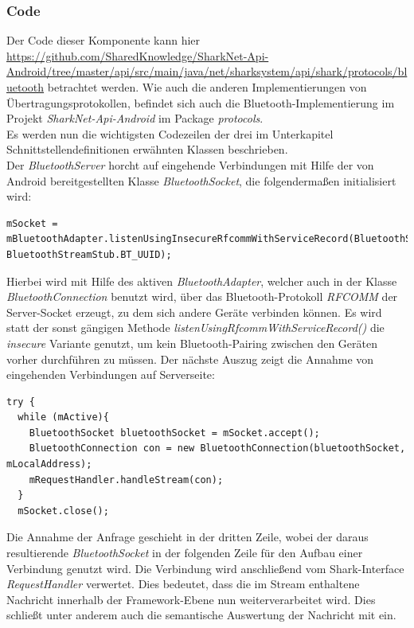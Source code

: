 \subsubsection{Code}
Der Code dieser Komponente kann hier \url{https://github.com/SharedKnowledge/SharkNet-Api-Android/tree/master/api/src/main/java/net/sharksystem/api/shark/protocols/bluetooth} betrachtet werden. Wie auch die anderen Implementierungen von Übertragungsprotokollen, befindet sich auch die Bluetooth-Implementierung im Projekt \textit{SharkNet-Api-Android} im Package \textit{protocols}. 
\\Es werden nun die wichtigsten Codezeilen der drei im Unterkapitel Schnittstellendefinitionen erwähnten Klassen beschrieben.
\\Der \textit{BluetoothServer} horcht auf eingehende Verbindungen mit Hilfe der von Android bereitgestellten Klasse \textit{BluetoothSocket}, die folgendermaßen initialisiert wird:
 \lstset{language=Java, caption=Initialisierung des Bluetooth-Server-Sockets, label=DescriptiveLabel, numbers=left, numbersep=1em, breaklines=true, basicstyle=\small}
\begin{lstlisting}
mSocket = mBluetoothAdapter.listenUsingInsecureRfcommWithServiceRecord(BluetoothStreamStub.BT_NAME, BluetoothStreamStub.BT_UUID);
\end{lstlisting}
Hierbei wird mit Hilfe des aktiven \textit{BluetoothAdapter}, welcher auch in der Klasse \textit{BluetoothConnection} benutzt wird, über das Bluetooth-Protokoll \textit{RFCOMM} der Server-Socket erzeugt, zu dem sich andere Geräte verbinden können. Es wird statt der sonst gängigen Methode \textit{listenUsingRfcommWithServiceRecord()} die \textit{insecure} Variante genutzt, um kein Bluetooth-Pairing zwischen den Geräten vorher durchführen zu müssen. Der nächste Auszug zeigt die Annahme von eingehenden Verbindungen auf Serverseite:
 \lstset{language=Java, caption=Serverseitige Annahme der Bluetooth-Verbindungen (Auszug), label=DescriptiveLabel, numbers=left, numbersep=1em, breaklines=true, basicstyle=\small}
\begin{lstlisting}
try {
  while (mActive){
    BluetoothSocket bluetoothSocket = mSocket.accept();
    BluetoothConnection con = new BluetoothConnection(bluetoothSocket, mLocalAddress);
    mRequestHandler.handleStream(con);
  }
  mSocket.close();
\end{lstlisting}
Die Annahme der Anfrage geschieht in der dritten Zeile, wobei der daraus resultierende \textit{BluetoothSocket} in der folgenden Zeile für den Aufbau einer Verbindung genutzt wird. Die Verbindung wird anschließend vom Shark-Interface \textit{RequestHandler} verwertet. Dies bedeutet, dass die im Stream enthaltene Nachricht innerhalb der Framework-Ebene nun weiterverarbeitet wird. Dies schließt unter anderem auch die semantische Auswertung der Nachricht mit ein.
